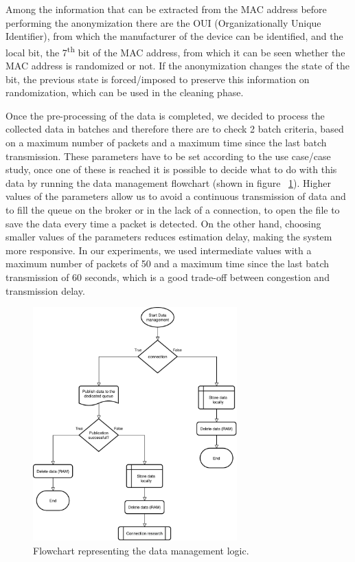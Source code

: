 Among the information that can be extracted from the MAC address before performing the anonymization there are the OUI (Organizationally Unique Identifier), from which the manufacturer of the device can be identified, and the local bit, the 7\textsuperscript{th} bit of the MAC address, from which it can be seen whether the MAC address is randomized or not. If the anonymization changes the state of the bit, the previous state is forced/imposed to preserve this information on randomization, which can be used in the cleaning phase.

Once the pre-processing of the data is completed, we decided to process the collected data in batches and therefore there are to check 2 batch criteria, based on a maximum number of packets and a maximum time since the last batch transmission. These parameters have to be set according to the use case/case study, once one of these is reached it is possible to decide what to do with this data by running the data management flowchart (shown in figure ~\ref{fig:flowdata}).
Higher values of the parameters allow us to avoid a continuous transmission of data and to fill the queue on the broker or in the lack of a connection, to open the file to save the data every time a packet is detected. On the other hand, choosing smaller values of the parameters reduces estimation delay, making the system more responsive. In our experiments, we used intermediate values with a maximum number of packets of 50 and a maximum time since the last batch transmission of 60 seconds, which is a good trade-off between congestion and transmission delay.

\begin{figure}[h]
\centering 
\includegraphics[width=0.7\textwidth]{images/flowdata} 
\caption{Flowchart representing the data management logic.}
\label{fig:flowdata}
\end{figure}

